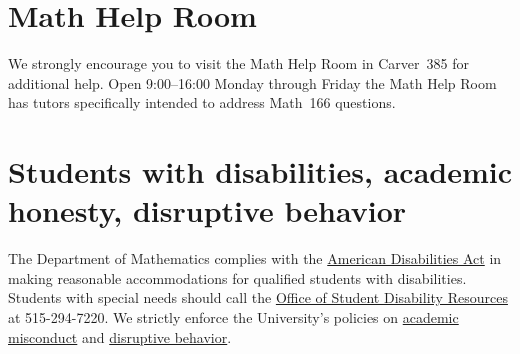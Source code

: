 \documentclass[11pt]{article}
\begin{document}
\section{Math Help Room}\label{MathCenter}
We strongly encourage you to visit the Math Help Room
in Carver~385 for additional help.
Open 9:00--16:00 Monday through Friday the Math Help Room
has tutors specifically intended to address Math~166 questions.

\section{Students with disabilities, academic honesty, disruptive behavior}
The Department of Mathematics complies with the 
\href{http://www.ada.gov}{American Disabilities Act} in making reasonable 
accommodations for qualified students with disabilities.  Students with 
special needs should call the 
\href{http://www.dso.iastate.edu/dr}{Office of Student Disability Resources} at
515-294-7220.
We strictly enforce the University's policies on 
\href{http://www.dso.iastate.edu/ja/academic/misconduct}{academic misconduct}
and \href{http://www.dso.iastate.edu/sa/issuesconcerns/disruption}
{disruptive behavior}.
\end{document}
